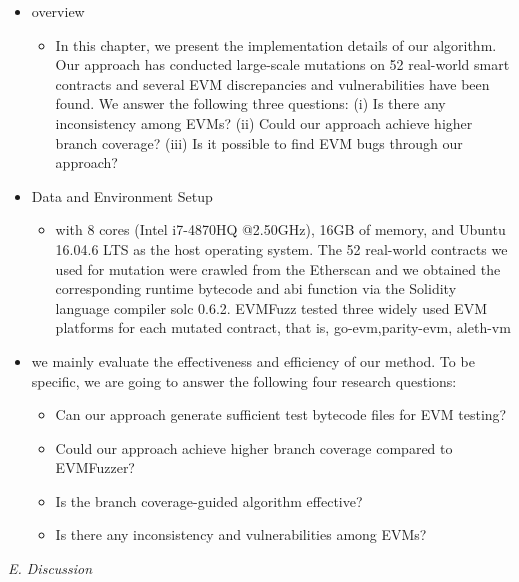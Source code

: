 \documentclass[a4paper]{article}
\begin{document}
	\begin{itemize}
		\item overview
		\begin{itemize}
			\item In this chapter, we present the implementation details of our algorithm. Our approach has conducted large-scale mutations on 52 real-world smart contracts and several EVM discrepancies and vulnerabilities have been found. We answer the following three questions: (i) Is there any
			inconsistency among EVMs? (ii) Could our approach achieve higher
			branch coverage? (iii) Is it possible to
			find EVM bugs through our approach?
		\end{itemize}
		\item Data and Environment Setup
		\begin{itemize}
			\item with 8 cores (Intel
			i7-4870HQ @2.50GHz), 16GB of memory, and Ubuntu 16.04.6 LTS as the
			host operating system. The 52 real-world contracts we used
			for mutation were crawled from the Etherscan and we obtained the corresponding runtime bytecode and abi function via the Solidity
			language compiler solc 0.6.2. EVMFuzz tested three widely
			used EVM platforms for each mutated contract, that is, go-evm,parity-evm, aleth-vm
		\end{itemize}
	     \item we mainly evaluate the effectiveness and efficiency of our method. To be specific, we are going to answer the following four research questions: 
	     \begin{itemize}
	     	\item Can our approach generate sufficient test bytecode
	     	files for EVM testing?
	     	\item Could our approach achieve higher
	     	branch coverage compared to EVMFuzzer?
	     	\item Is the  branch coverage-guided algorithm effective?
	     	\item Is there any
	     	inconsistency and vulnerabilities among EVMs?
	     \end{itemize}
	\end{itemize}
	\textit{E. Discussion}
\end{document}
